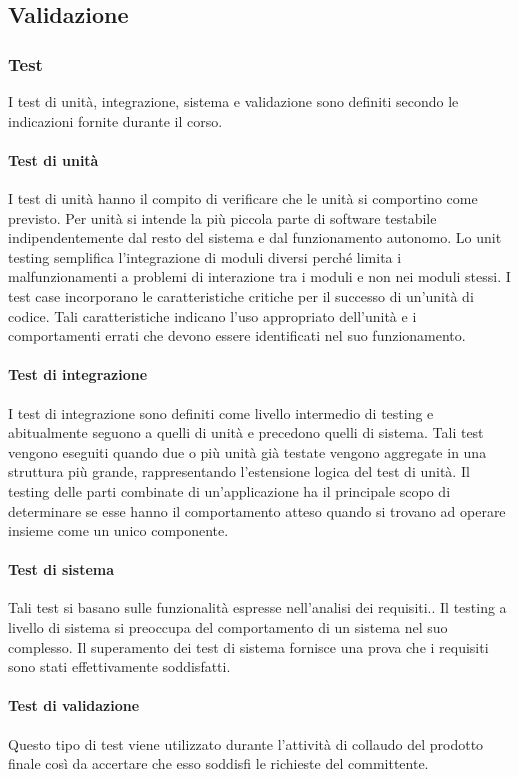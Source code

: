 \documentclass[11pt,a4paper]{article}
\begin{document}
{	\subsection{Validazione}
	\subsubsection{Test}
	I test di unità, integrazione, sistema e validazione sono definiti secondo le indicazioni fornite durante il corso.
	\paragraph{Test di unità}
	I test di unità hanno il compito di verificare che le unità si comportino come previsto.
	Per unità si intende la più piccola parte di software testabile indipendentemente dal resto del sistema e dal funzionamento autonomo.
	Lo unit testing semplifica l'integrazione di moduli diversi perché limita i malfunzionamenti a problemi di interazione tra i moduli e non nei moduli stessi.
	I test case incorporano le caratteristiche critiche per il successo di un'unità di codice. Tali caratteristiche indicano l'uso appropriato dell'unità e i comportamenti errati che devono essere identificati nel suo funzionamento.
	\paragraph{Test di integrazione}
	I test di integrazione sono definiti come livello intermedio di testing e abitualmente seguono a quelli di unità e precedono quelli di sistema.
	Tali test vengono eseguiti quando due o più unità già testate vengono aggregate in una struttura più grande, rappresentando l’estensione logica del test di unità.
	Il testing delle parti combinate di un'applicazione ha il principale scopo di determinare se esse hanno il comportamento atteso quando si trovano ad operare insieme come un unico componente.
	\paragraph{Test di sistema}
	Tali test si basano sulle funzionalità espresse nell'analisi dei requisiti..
	Il testing a livello di sistema si preoccupa del comportamento di un sistema nel suo complesso.
	Il superamento dei test di sistema fornisce una prova che i requisiti sono stati effettivamente soddisfatti.
	
	
	\paragraph{Test di validazione}
	Questo tipo di test viene utilizzato durante l'attività di collaudo del prodotto  finale così da accertare
	che esso soddisfi le richieste del committente.
}
\end{document}

